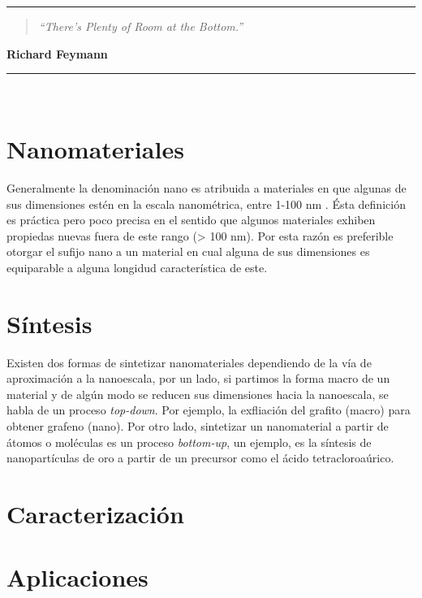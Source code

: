 \noindent
\rule{\linewidth}{1 pt}
\begin{flushright}
	\begin{quotation}
		\small{
			\textit{``There’s Plenty of Room at the Bottom.''}}
	\end{quotation}
	\bf{Richard Feymann}
\end{flushright}
\noindent
\rule{\linewidth}{1 pt}\\
\vfill
\section{Nanomateriales}
Generalmente la denominación nano es atribuida a materiales en que algunas de sus dimensiones estén en la escala nanométrica, entre 1-100 nm \cite{Gressler2013}. Ésta definición es práctica pero poco precisa en el sentido que algunos materiales exhiben propiedas nuevas fuera de este rango (> 100 nm). Por esta razón es preferible otorgar el sufijo nano a un material en cual alguna de sus dimensiones es equiparable a alguna longidud característica de este.
\section{Síntesis}
Existen dos formas de sintetizar nanomateriales dependiendo de la vía de aproximación a la nanoescala, por un lado, si partimos la forma macro de un material y de algún modo se reducen sus dimensiones hacia la nanoescala, se habla de un proceso \textit{top-down}. Por ejemplo, la exfliación del grafito (macro) para obtener grafeno (nano).  Por otro lado, sintetizar un nanomaterial a partir de átomos o moléculas es un proceso \textit{bottom-up}, un ejemplo, es la síntesis de nanopartículas de oro a partir de un precursor como el ácido tetracloroaúrico.

\section{Caracterización}

\section{Aplicaciones}
